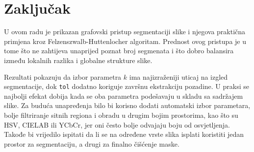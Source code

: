 \documentclass[11pt,a4paper]{article}
\begin{document}
\section{Zaključak}
U ovom radu je prikazan grafovski pristup segmentaciji slike i njegova praktična primjena kroz Felzenszwalb-Huttenlocher algoritam. Prednost ovog pristupa je u tome što ne zahtijeva unaprijed poznat broj segmenata i što dobro balansira između lokalnih razlika i globalne strukture slike.

Rezultati pokazuju da izbor parametra $k$ ima najizraženiji uticaj na izgled segmentacije, dok \texttt{tol} dodatno koriguje završnu ekstrakciju pozadine. U praksi se najbolji efekat dobija kada se oba parametra podešavaju u skladu sa sadržajem slike. Za buduća unapređenja bilo bi korisno dodati automatski izbor parametara, bolje filtriranje sitnih regiona i obradu u drugim bojim prostorima, kao što su HSV, CIELAB ili YCbCr, jer oni često bolje odvajaju boju od osvjetljenja. Takođe bi vrijedilo ispitati da li se na određene vrste slika isplati koristiti jedan prostor za segmentaciju, a drugi za finalno čišćenje maske.
\end{document}
